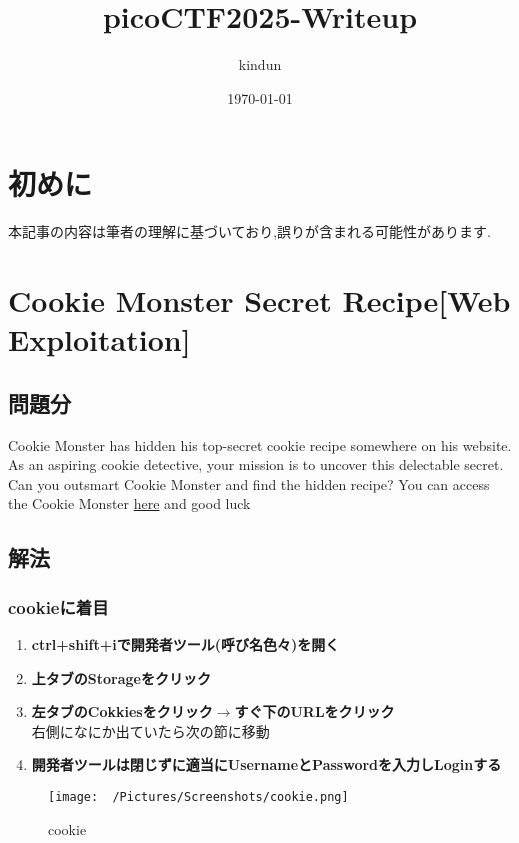\documentclass{jsarticle}
\title{picoCTF2025-Writeup}
\author{kindun}
\date{\today}
\begin{document}
\maketitle 

\section{初めに}
本記事の内容は筆者の理解に基づいており,誤りが含まれる可能性があります.

\section{Cookie Monster Secret Recipe[Web Exploitation]}
\subsection{問題分}
Cookie Monster has hidden his top-secret cookie recipe somewhere on his website. As an aspiring cookie detective, your mission is to uncover this delectable secret. Can you outsmart Cookie Monster and find the hidden recipe? You can access the Cookie Monster \href{http://verbal-sleep.picoctf.net:56571/}{here} and good luck

\subsection{解法}
\subsubsection{cookieに着目}
\begin{enumerate}
	\item \textbf{ctrl+shift+iで開発者ツール(呼び名色々)を開く}
	\item \textbf{上タブのStorageをクリック}
	\item \textbf{左タブのCokkiesをクリック$ \xrightarrow{} $すぐ下のURLをクリック}\\
	右側になにか出ていたら次の節に移動
	\item \textbf{開発者ツールは閉じずに適当にUsernameとPasswordを入力しLoginする}
\end{enumerate}

\begin{figure}[h]
\begin{center}
\texttt{[image: ~/Pictures/Screenshots/cookie.png]}
\caption{cookie}
\end{center}
\end{figure}
\end{document}
